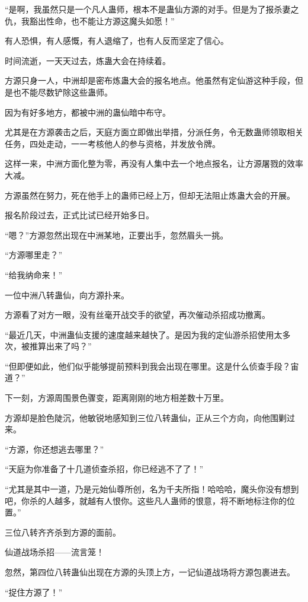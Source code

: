 \begin{this_body}
“是啊，我虽然只是一个凡人蛊师，根本不是蛊仙方源的对手。但是为了报杀妻之仇，我豁出性命，也不能让方源这魔头如愿！”

有人恐惧，有人感慨，有人退缩了，也有人反而坚定了信心。

时间流逝，一天天过去，炼蛊大会在持续着。

方源只身一人，中洲却是密布炼蛊大会的报名地点。他虽然有定仙游这种手段，但是也不能尽数铲除这些蛊师。

因为有好多地方，都被中洲的蛊仙暗中布守。

尤其是在方源袭击之后，天庭方面立即做出举措，分派任务，令无数蛊师领取相关任务，四处走动，一一考核他人的参与资格，并发放令牌。

这样一来，中洲方面化整为零，再没有人集中去一个地点报名，让方源屠戮的效率大减。

方源虽然在努力，死在他手上的蛊师已经上万，但却无法阻止炼蛊大会的开展。

报名阶段过去，正式比试已经开始多日。

“嗯？”方源忽然出现在中洲某地，正要出手，忽然眉头一挑。

“方源哪里走？”

“给我纳命来！”

一位中洲八转蛊仙，向方源扑来。

方源看了对方一眼，没有丝毫开战交手的欲望，再次催动杀招成功撤离。

“最近几天，中洲蛊仙支援的速度越来越快了。是因为我的定仙游杀招使用太多次，被推算出来了吗？”

“但即便如此，他们似乎能够提前预料到我会出现在哪里。这是什么侦查手段？宙道？”

下一刻，方源周围景色骤变，距离刚刚的地方相差数十万里。

方源却是脸色陡沉，他敏锐地感知到三位八转蛊仙，正从三个方向，向他围剿过来。

“方源，你还想逃去哪里？”

“天庭为你准备了十几道侦查杀招，你已经逃不了了！”

“尤其是其中一道，乃是元始仙尊所创，名为千夫所指！哈哈哈，魔头你没有想到吧，你杀的人越多，就越有人恨你。这些凡人蛊师的恨意，将不断地标注你的位置。”

三位八转齐齐杀到方源的面前。

仙道战场杀招——流言笼！

忽然，第四位八转蛊仙出现在方源的头顶上方，一记仙道战场将方源包裹进去。

“捉住方源了！”


\end{this_body}
